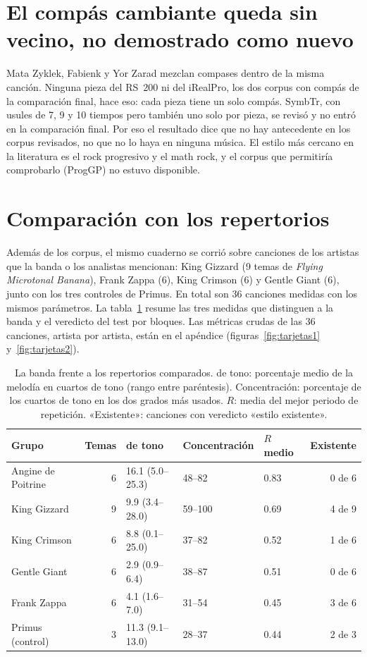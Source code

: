 \section{El compás cambiante queda sin vecino, no demostrado como nuevo}

Mata Zyklek, Fabienk y Yor Zarad mezclan compases dentro de la misma canción. Ninguna pieza del RS~200 ni del iRealPro,
los dos corpus con compás de la comparación final, hace eso: cada pieza tiene un solo compás. SymbTr, con usules de 7, 9 y
10 tiempos pero también uno solo por pieza, se revisó y no entró en la comparación final. Por eso el resultado dice que no
hay antecedente en los corpus revisados, no que no lo haya en ninguna música. El estilo más cercano en la literatura es
el rock progresivo y el math rock, y el corpus que permitiría comprobarlo (ProgGP) no estuvo disponible.

\section{Comparación con los repertorios}\label{sec:repertorios}

Además de los corpus, el mismo cuaderno se corrió sobre canciones de los artistas que la banda o los analistas mencionan:
King Gizzard (9 temas de \emph{Flying Microtonal Banana}), Frank Zappa (6), King Crimson (6) y Gentle Giant (6), junto con
los tres controles de Primus. En total son 36 canciones medidas con los mismos parámetros. La
tabla~\ref{tab:repertorios} resume las tres medidas que distinguen a la banda y el veredicto del test por bloques.
Las métricas crudas de las 36 canciones, artista por artista, están en el apéndice (figuras~\ref{fig:tarjetas1}
y~\ref{fig:tarjetas2}).

\begin{table}[ht]
  \centering\small
  \caption{La banda frente a los repertorios comparados. \cuarto{} de tono: porcentaje medio de la melodía en cuartos de
  tono (rango entre paréntesis). Concentración: porcentaje de los cuartos de tono en los dos grados más usados. $R$: media
  del mejor periodo de repetición. «Existente»: canciones con veredicto «estilo existente».}\label{tab:repertorios}
  \begin{tabular}{@{}lrlllr@{}}
    \toprule
    Grupo & Temas & \cuarto{} de tono & Concentración & $R$ medio & Existente \\
    \midrule
    Angine de Poitrine & 6 & 16.1 (5.0--25.3) & 48--82 & 0.83 & 0 de 6 \\
    King Gizzard & 9 & 9.9 (3.4--28.0) & 59--100 & 0.69 & 4 de 9 \\
    King Crimson & 6 & 8.8 (0.1--25.0) & 37--82 & 0.52 & 1 de 6 \\
    Gentle Giant & 6 & 2.9 (0.9--6.4) & 38--87 & 0.51 & 0 de 6 \\
    Frank Zappa & 6 & 4.1 (1.6--7.0) & 31--54 & 0.45 & 3 de 6 \\
    Primus (control) & 3 & 11.3 (9.1--13.0) & 28--37 & 0.44 & 2 de 3 \\
    \bottomrule
  \end{tabular}
\end{table}

